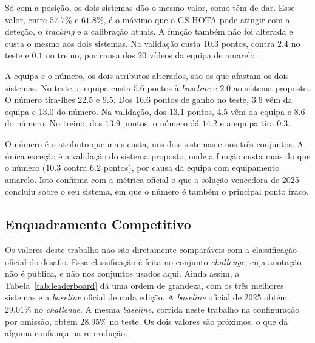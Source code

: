 Só com a posição, os dois sistemas dão o mesmo valor, como têm de dar. Esse valor, entre $57.7\%$ e $61.8\%$, é o máximo que o GS-HOTA pode atingir com a deteção, o \emph{tracking} e a calibração atuais. A função também não foi alterada e custa o mesmo aos dois sistemas. Na validação custa $10.3$ pontos, contra $2.4$ no teste e $0.1$ no treino, por causa dos $20$ vídeos da equipa de amarelo.

A equipa e o número, os dois atributos alterados, são os que afastam os dois sistemas. No teste, a equipa custa $5.6$ pontos à \emph{baseline} e $2.0$ ao sistema proposto. O número tira-lhes $22.5$ e $9.5$. Dos $16.6$ pontos de ganho no teste, $3.6$ vêm da equipa e $13.0$ do número. Na validação, dos $13.1$ pontos, $4.5$ vêm da equipa e $8.6$ do número. No treino, dos $13.9$ pontos, o número dá $14.2$ e a equipa tira $0.3$.

O número é o atributo que mais custa, nos dois sistemas e nos três conjuntos. A única exceção é a validação do sistema proposto, onde a função custa mais do que o número ($10.3$ contra $6.2$ pontos), por causa da equipa com equipamento amarelo. Isto confirma com a métrica oficial o que a solução vencedora de 2025 concluiu sobre o seu sistema, em que o número é também o principal ponto fraco.

\subsection{Enquadramento Competitivo}\label{sec:res_leaderboard}

Os valores deste trabalho não são diretamente comparáveis com a classificação oficial do desafio. Essa classificação é feita no conjunto \emph{challenge}, cuja anotação não é pública, e não nos conjuntos usados aqui. Ainda assim, a Tabela~\ref{tab:leaderboard} dá uma ordem de grandeza, com os três melhores sistemas e a \emph{baseline} oficial de cada edição. A \emph{baseline} oficial de 2025 obtém $29.01\%$ no \emph{challenge}. A mesma \emph{baseline}, corrida neste trabalho na configuração por omissão, obtém $28.95\%$ no teste. Os dois valores são próximos, o que dá alguma confiança na reprodução.

